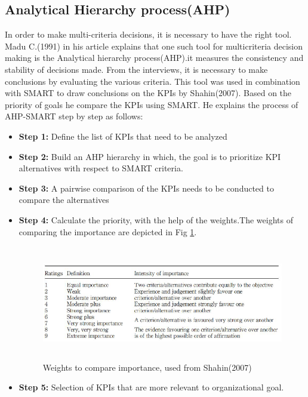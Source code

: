 \subsection{Analytical Hierarchy process(AHP)}
In order to make multi-criteria decisions, it is necessary to have the right tool.  Madu C.(1991) in his article explains that one such tool for multicriteria decision making is the Analytical hierarchy process(AHP).it measures the consistency and stability of decisions made. From the interviews, it is necessary to make conclusions by evaluating the various criteria. This tool was used in combination with SMART to draw conclusions on the KPIs by Shahin(2007). Based on the priority of goals he compare the KPIs using SMART. He explains the process of AHP-SMART step by step as follows:\\

\begin{itemize}
    \item \textbf{Step 1:}
    Define the list of KPIs that need to be analyzed
    \item \textbf{Step 2:}
    Build an AHP hierarchy in which, the goal is to prioritize KPI alternatives with respect to SMART criteria. 
    \item \textbf{Step 3:}
    A pairwise comparison of the KPIs needs to be conducted to compare the alternatives
    \item \textbf{Step 4:}
    Calculate the priority, with the help of the weights.The weights of comparing the importance are depicted in Fig \ref{fig:4.4}.
    \begin{figure}[H]
    \centering
    \captionsetup{justification=centering, margin=2cm}
    \vspace{1cm}
    \includegraphics[width=15cm, height=5cm]{figure/auxiliary/fig44.PNG}
    \caption{ Weights to compare importance, used from Shahin(2007)}
    \label{fig:4.4}
\end{figure}
    \item \textbf{Step 5:}
    Selection of KPIs that are more relevant to organizational goal.
    \\
\end{itemize}

